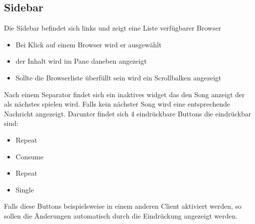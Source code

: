 \subsection{Sidebar}
Die Sidebar befindet sich links und zeigt eine Liste verfügbarer Browser
\begin{itemize}
  \item Bei Klick auf einem Browser wird er ausgewählt
  \item der Inhalt wird im Pane daneben angezeigt
  \item Sollte die Browserliste überfüllt sein wird ein Scrollbalken angezeigt
\end{itemize}
Nach einem Separator findet sich ein inaktives widget das den Song anzeigt der als nächstes spielen wird.
Falls kein nächster Song wird eine entsprechende Nachricht angezeigt.
Darunter findet sich 4 eindrückbare Buttons die eindrückbar sind:
\begin{itemize}
  \item Repeat
  \item Consume
  \item Repeat
  \item Single
\end{itemize}
Falls diese Buttons beispielsweise in einem anderen Client aktiviert werden, 
so sollen die Änderungen automatisch durch die Eindrückung angezeigt werden.



